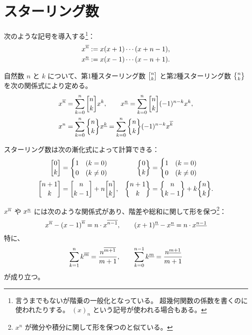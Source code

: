 {\section{スターリング数} \label{sec:stirling-numbers}
次のような記号を導入する\footnote{%
言うまでもないが階乗の一般化となっている。
超幾何関数の係数を書くのに使われたりする。
$(x)_n$ という記号が使われる場合もある。
}：
\begin{align*}
  {x}^{\overline{n}}&:=x(x+1)\dotsb(x+n-1), \\
  {x}^{\underline{n}}&:=x(x-1)\dotsb(x-n+1).
\end{align*}

自然数 $n$ と $k$ について、第1種スターリング数 $\stirlingI{n}{k}$ と第2種スターリング数 $\stirlingII{n}{k}$ を次の関係式により定める。
\begin{align*}
  \risingFactorial{x}{n}&=\sum_{k=0}^n \stirlingI{n}{k} x^k, \qquad
  \fallingFactorial{x}{n}=\sum_{k=0}^n \stirlingI{n}{k} (-1)^{n-k} x^k, \\
  x^n&=\sum_{k=0}^n \stirlingII{n}{k} \fallingFactorial{x}{k}
       =\sum_{k=0}^n \stirlingII{n}{k} (-1)^{n-k} \risingFactorial{x}{k}
\end{align*}

スターリング数は次の漸化式によって計算できる：
\begin{align*}
  \stirlingI{0}{k}&=\begin{cases}
    1 & (k=0) \\
    0 & (k\ne 0)
  \end{cases} &
  \stirlingII{0}{k}&=\begin{cases}
    1 & (k=0) \\
    0 & (k\ne 0)
  \end{cases} \\
  \stirlingI{n+1}{k}&=\stirlingI{n}{k-1}+n\stirlingI{n}{k}, &
  \stirlingII{n+1}{k}&=\stirlingII{n}{k-1}+k\stirlingII{n}{k}.
\end{align*}

${x}^{\overline{n}}$ や ${x}^{\underline{n}}$ には次のような関係式があり、階差や総和に関して形を保つ\footnote{$x^n$ が微分や積分に関して形を保つのと似ている。}：
\begin{equation*}
  {x}^{\overline{n}}-{(x-1)}^{\overline{n}}=n\cdot{x}^{\overline{n-1}}, \qquad
  {(x+1)}^{\underline{n}}-{x}^{\underline{n}}=n\cdot{x}^{\underline{n-1}}
\end{equation*}
特に、
\begin{equation*}
  \sum_{k=1}^{n} {k}^{\overline{m}}
  =\frac{{n}^{\overline{m+1}}}{m+1}, \qquad
  \sum_{k=0}^{n-1} {k}^{\underline{m}}
  =\frac{{n}^{\underline{m+1}}}{m+1}
\end{equation*}
が成り立つ。

}
